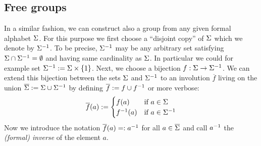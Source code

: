 \subsection{Free groups}
In a similar fashion, we can construct also a group from any given formal alphabet $\Sigma$. For this purpose we first choose a ``disjoint copy'' of $\Sigma$ which we denote by ${\Sigma}^{-1}$. To be precise, ${\Sigma}^{-1}$ may be any arbitrary set satisfying $\Sigma \cap {\Sigma}^{-1} = \emptyset$ and having same cardinality as $\Sigma$. In particular we could for example set ${\Sigma}^{-1} := \Sigma \times \{1\}$. Next, we choose a bijection $f : \Sigma \to {\Sigma}^{-1}$. We can extend this bijection between the sets $\Sigma$ and ${\Sigma}^{-1}$ to an involution $\overline{f}$ living on the union $\overline{\Sigma} := \Sigma \cup {\Sigma}^{-1}$ by defining $\overline{f} := f \cup {f}^{-1}$ or more verbose:
\begin{equation*}
\overline{f}(a) := \begin{cases}
f(a)       & \text{if } a \in \Sigma\\
{f}^{-1}(a) & \text{if } a \in {\Sigma}^{-1}
\end{cases}
\end{equation*}
Now we introduce the notation $\overline{f}(a) =: {a}^{-1}$ for all $a \in \overline{\Sigma}$ and call ${a}^{-1}$ the \emph{(formal) inverse} of the element $a$. 

